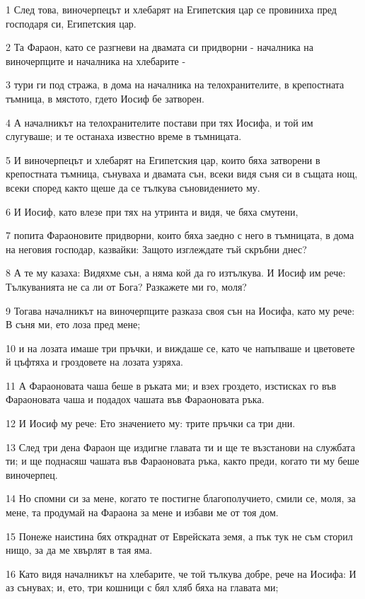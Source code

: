 \par 1 След това, виночерпецът и хлебарят на Египетския цар се провиниха пред господаря си, Египетския цар.
\par 2 Та Фараон, като се разгневи на двамата си придворни - началника на виночерпците и началника на хлебарите -
\par 3 тури ги под стража, в дома на началника на телохранителите, в крепостната тъмница, в мястото, гдето Иосиф бе затворен.
\par 4 А началникът на телохранителите постави при тях Иосифа, и той им слугуваше; и те останаха известно време в тъмницата.
\par 5 И виночерпецът и хлебарят на Египетския цар, които бяха затворени в крепостната тъмница, сънуваха и двамата сън, всеки видя съня си в същата нощ, всеки според както щеше да се тълкува съновидението му.
\par 6 И Иосиф, като влезе при тях на утринта и видя, че бяха смутени,
\par 7 попита Фараоновите придворни, които бяха заедно с него в тъмницата, в дома на неговия господар, казвайки: Защото изглеждате тъй скръбни днес?
\par 8 А те му казаха: Видяхме сън, а няма кой да го изтълкува. И Иосиф им рече: Тълкуванията не са ли от Бога? Разкажете ми го, моля?
\par 9 Тогава началникът на виночерпците разказа своя сън на Иосифа, като му рече: В съня ми, ето лоза пред мене;
\par 10 и на лозата имаше три пръчки, и виждаше се, като че напъпваше и цветовете й цъфтяха и гроздовете на лозата узряха.
\par 11 А Фараоновата чаша беше в ръката ми; и взех гроздето, изстисках го във Фараоновата чаша и подадох чашата във Фараоновата ръка.
\par 12 И Иосиф му рече: Ето значението му: трите пръчки са три дни.
\par 13 След три дена Фараон ще издигне главата ти и ще те възстанови на службата ти; и ще поднасяш чашата във Фараоновата ръка, както преди, когато ти му беше виночерпец.
\par 14 Но спомни си за мене, когато те постигне благополучието, смили се, моля, за мене, та продумай на Фараона за мене и избави ме от тоя дом.
\par 15 Понеже наистина бях откраднат от Еврейската земя, а пък тук не съм сторил нищо, за да ме хвърлят в тая яма.
\par 16 Като видя началникът на хлебарите, че той тълкува добре, рече на Иосифа: И аз сънувах; и, ето, три кошници с бял хляб бяха на главата ми;
